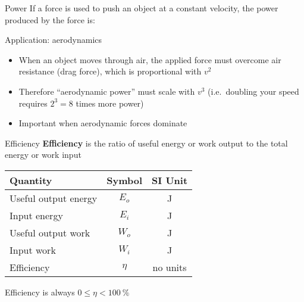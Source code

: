 \documentclass[12pt,compress,aspectratio=169]{beamer}
\begin{document}
\begin{frame}{Power}
  If a force is used to push an object at a constant velocity, the power
  produced by the force is:
  
  
  Application: aerodynamics
  \begin{itemize}
  \item When an object moves through air, the applied force must overcome air
    resistance (drag force), which is proportional with $v^2$
    \item Therefore ``aerodynamic power'' must scale with $v^3$ (i.e.\ doubling
      your speed requires $2^3=8$ times more power)
    \item Important when aerodynamic forces dominate
  \end{itemize}
\end{frame}



\begin{frame}{Efficiency}
  \textbf{Efficiency} is the ratio of useful energy or work output to the total
  energy or work input

  \begin{center}
    \begin{tabular}{l|c|c}
      \rowcolor{pink}
      \textbf{Quantity} & \textbf{Symbol} & \textbf{SI Unit} \\ \hline
      Useful output energy & $E_o$  & \si\joule \\
      Input energy         & $E_i$  & \si\joule \\
      Useful output work   & $W_o$  & \si\joule \\
      Input work           & $W_i$  & \si\joule \\
      Efficiency           & $\eta$ & no units
    \end{tabular}
  \end{center}
  Efficiency is always $0\leq\eta<\SI{100}\percent$
\end{frame}
\end{document}
